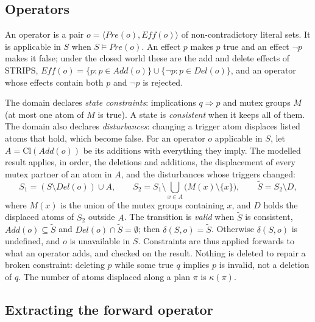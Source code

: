 \subsection{Operators}
\label{sec:operators}

An operator is a pair $o=\langle \mathit{Pre}(o),\mathit{Eff}(o)\rangle$ of
non-contradictory literal sets. It is applicable in $S$ when $S\models\mathit{Pre}(o)$.
An effect $p$ makes $p$ true and an effect $\neg p$ makes it false; under the closed
world these are the add and delete effects of STRIPS,
$\mathit{Eff}(o)=\{p: p\in \mathit{Add}(o)\}\cup\{\neg p: p\in\mathit{Del}(o)\}$, and an
operator whose effects contain both $p$ and $\neg p$ is rejected.

The domain declares \emph{state constraints}: implications $q\Rightarrow p$ and mutex
groups $M$ (at most one atom of $M$ is true). A state is \emph{consistent} when it keeps
all of them. The domain also declares \emph{disturbances}: changing a trigger atom
displaces listed atoms that hold, which become false. For an operator $o$ applicable in
$S$, let $A=\mathrm{Cl}(\mathit{Add}(o))$ be its additions with everything they imply.
The modelled result applies, in order, the deletions and additions, the displacement of
every mutex partner of an atom in $A$, and the disturbances whose triggers changed:
\begin{equation}
  S_1=(S\setminus\mathit{Del}(o))\cup A,\qquad
  S_2=S_1\setminus\textstyle\bigcup_{x\in A}\bigl(M(x)\setminus\{x\}\bigr),\qquad
  \tilde S=S_2\setminus D,
\end{equation}
where $M(x)$ is the union of the mutex groups containing $x$, and $D$ holds the
displaced atoms of $S_2$ outside $A$. The transition is
\emph{valid} when $\tilde S$ is consistent, $\mathit{Add}(o)\subseteq\tilde S$ and
$\mathit{Del}(o)\cap\tilde S=\emptyset$; then $\delta(S,o)=\tilde S$. Otherwise
$\delta(S,o)$ is undefined, and $o$ is unavailable in $S$. Constraints are thus applied
forwards to what an operator adds, and checked on the result. Nothing is deleted to
repair a broken constraint: deleting $p$ while some true $q$ implies $p$ is invalid, not
a deletion of $q$. The number of atoms displaced along a plan $\pi$ is $\kappa(\pi)$.

\subsection{Extracting the forward operator}
\label{sec:extraction}

